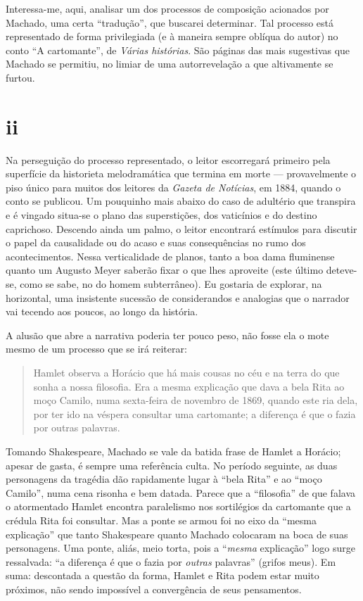 Interessa-me, aqui, analisar um dos processos de composição acionados
por Machado, uma certa ``tradução'', que buscarei determinar. Tal
processo está representado de forma privilegiada (e à maneira sempre
oblíqua do autor) no conto ``A cartomante'', de \emph{Várias histórias}.
São páginas das mais sugestivas que Machado se permitiu, no limiar de
uma autorrevelação a que altivamente se furtou.

\section{ii}

Na perseguição do processo representado, o leitor escorregará primeiro
pela superfície da historieta melodramática que termina em morte ---
provavelmente o piso único para muitos dos leitores da \emph{Gazeta de
Notícias}, em 1884, quando o conto se publicou. Um pouquinho mais abaixo
do caso de adultério que transpira e é vingado situa-se o plano das
superstições, dos vaticínios e do destino caprichoso. Descendo ainda um
palmo, o leitor encontrará estímulos para discutir o papel da
causalidade ou do acaso e suas consequências no rumo dos acontecimentos.
Nessa verticalidade de planos, tanto a boa dama fluminense quanto um
Augusto Meyer saberão fixar o que lhes aproveite (este último deteve-se,
como se sabe, no do homem subterrâneo). Eu gostaria de explorar, na
horizontal, uma insistente sucessão de considerandos e analogias que o
narrador vai tecendo aos poucos, ao longo da história.

A alusão que abre a narrativa poderia ter pouco peso, não fosse ela o
mote mesmo de um processo que se irá reiterar:

\begin{quote}
Hamlet observa a Horácio que há mais cousas no céu e na terra do que
sonha a nossa filosofia. Era a mesma explicação que dava a bela Rita ao
moço Camilo, numa sexta-feira de novembro de 1869, quando este ria dela,
por ter ido na véspera consultar uma cartomante; a diferença é que o
fazia por outras palavras.
\end{quote}

Tomando Shakespeare, Machado se vale da batida frase de Hamlet a
Horácio; apesar de gasta, é sempre uma referência culta. No período
seguinte, as duas personagens da tragédia dão rapidamente lugar à ``bela
Rita'' e ao ``moço Camilo'', numa cena risonha e bem datada. Parece que
a ``filosofia'' de que falava o atormentado Hamlet encontra paralelismo
nos sortilégios da cartomante que a crédula Rita foi consultar. Mas a
ponte se armou foi no eixo da ``mesma explicação'' que tanto Shakespeare
quanto Machado colocaram na boca de suas personagens. Uma ponte, aliás,
meio torta, pois a ``\emph{mesma} explicação'' logo surge ressalvada:
``a diferença é que o fazia por \emph{outras} palavras'' (grifos meus).
Em suma: descontada a questão da forma, Hamlet e Rita podem estar muito
próximos, não sendo impossível a convergência de seus pensamentos.

